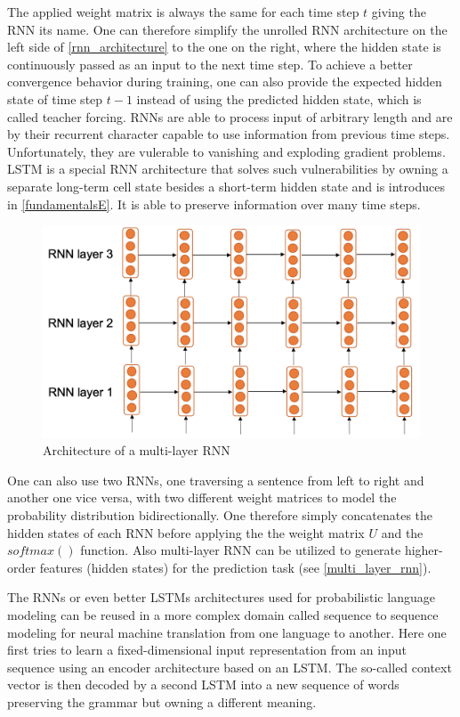 The applied weight matrix is always the same for each time step $t$ giving the \ac{RNN} its name. One can therefore simplify the unrolled \ac{RNN} architecture on the left side of \autoref{rnn_architecture} to the one on the right, where the hidden state is continuously passed as an input to the next time step. To achieve a better convergence behavior during training, one can also provide the expected hidden state of time step $t-1$ instead of using the predicted hidden state, which is called teacher forcing. \acp{RNN} are able to process input of arbitrary length and are by their recurrent character capable to use information from previous time steps. Unfortunately, they are vulerable to vanishing and exploding gradient problems. \ac{LSTM} is a special \ac{RNN} architecture that solves such vulnerabilities by owning a separate long-term cell state besides a short-term hidden state and is introduces in \autoref{fundamentalsE}. It is able to preserve information over many time steps. \cite{Gertz2020}

\begin{figure}[ht]
	\centering
	\includegraphics[width=0.8\linewidth]{figures/multi_layer_rnn.png}
	\caption{Architecture of a multi-layer  \ac{RNN} \cite{Gertz2020}}
	\label{multi_layer_rnn}
\end{figure}

One can also use two \acp{RNN}, one traversing a sentence from left to right and another one vice versa, with two different weight matrices to model the probability distribution bidirectionally. One therefore simply concatenates the hidden states of each \ac{RNN} before applying the the weight matrix $U$ and the $softmax()$ function. Also multi-layer \acs{RNN} can be utilized to generate higher-order features (hidden states) for the prediction task (see \autoref{multi_layer_rnn}). \cite{Gertz2020}

The \acp{RNN} or even better \acp{LSTM} architectures used for probabilistic language modeling can be reused in a more complex domain called sequence to sequence modeling for neural machine translation from one language to another. Here one first tries to learn a fixed-dimensional input representation from an input sequence using an encoder architecture based on an \ac{LSTM}. The so-called context vector is then decoded by a second \ac{LSTM} into a new sequence of words preserving the grammar but owning a different meaning. \cite{Sutskever2014}

